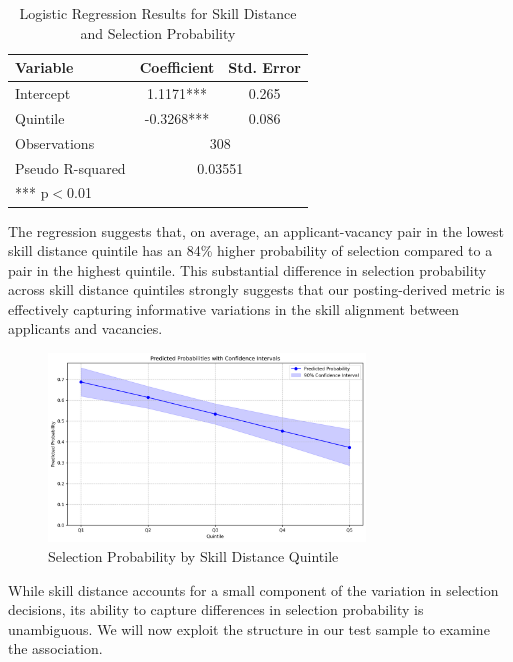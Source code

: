 \begin{table}[h]
    \centering
    \caption{Logistic Regression Results for Skill Distance and Selection Probability}
    \renewcommand{\arraystretch}{1.2} 
    \begin{tabular}{lcc}
    \hline
    \textbf{Variable} & \textbf{Coefficient} & \textbf{Std. Error} \\
    \hline
    Intercept & 1.1171*** & 0.265 \\
    Quintile & -0.3268*** & 0.086 \\
    \hline
    Observations & \multicolumn{2}{c}{308} \\
    Pseudo R-squared & \multicolumn{2}{c}{0.03551} \\
    \hline
    \multicolumn{3}{l}{\footnotesize{*** p$<$0.01}} \\
    \end{tabular}
    \label{tab:logistic_regression}
\end{table}

The regression suggests that, on average, an applicant-vacancy pair in the lowest skill distance quintile has an 84\% 
higher probability of selection compared to a pair in the highest quintile. This substantial difference in selection 
probability across skill distance quintiles strongly suggests that our posting-derived metric is effectively capturing 
informative variations in the skill alignment between applicants and vacancies.


\begin{figure}[h]
    \centering
    \includegraphics[width=0.75\textwidth]{new_img/pp.png}
    \caption{Selection Probability by Skill Distance Quintile}
    \label{fig:skill_distance_probability}
\end{figure}

While skill distance accounts for a small component of the variation in selection decisions, its ability to capture differences in selection probability is unambiguous. 
We will now exploit the structure in our test sample to examine the association. 


